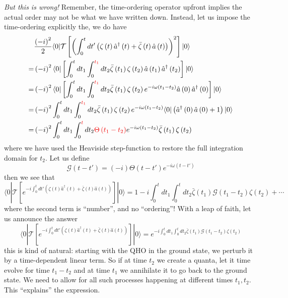 \emph{But this is wrong!} Remember, the time-ordering operator upfront implies the actual order may not be what we have written down. Instead, let us impose the time-ordering explicitly the, we do have
\begin{align*}
    &\frac{\left( -i \right) ^2}{2}\langle 0|\mathcal{T} \left[ \left( \int_0^t{dt'\left( \zeta \left( t \right) \hat{a}^{\dagger}\left( t \right) +\bar{\zeta}\left( t \right) \hat{a}\left( t \right) \right)} \right) ^2 \right] |0\rangle \\
    =&\left( -i \right) ^2\langle 0|\left[ \int_0^t{dt_1\int_0^{{\color[RGB]{240, 0, 0} t_1}}{dt_2\bar{\zeta}\left( t_1 \right) \zeta \left( t_2 \right) \hat{a}\left( t_1 \right) \hat{a}^{\dagger}\left( t_2 \right)}} \right] |0\rangle \\
    =&\left( -i \right) ^2\langle 0|\left[ \int_0^t{dt_1\int_0^{{\color[RGB]{240, 0, 0} t_1}}{dt_2\bar{\zeta}\left( t_1 \right) \zeta \left( t_2 \right) e^{-i\omega \left( t_1-t_2 \right)}}}\hat{a}\left( 0 \right) \hat{a}^{\dagger}\left( 0 \right) \right] |0\rangle \\
    =&\left( -i \right) ^2\int_0^t{dt_1\int_0^{{\color[RGB]{240, 0, 0} t_1}}{dt_2\bar{\zeta}\left( t_1 \right) \zeta \left( t_2 \right) e^{-i\omega \left( t_1-t_2 \right)}}}\langle 0|\left( \hat{a}^{\dagger}\left( 0 \right) \hat{a}\left( 0 \right) +1 \right) |0\rangle \\
    =&\left( -i \right) ^2\int_0^t{dt_1\int_0^{{\color[RGB]{240, 0, 0} t}}{dt_2{\color[RGB]{240, 0, 0} \Theta \left( t_1-t_2 \right) }e^{-i\omega \left( t_1-t_2 \right)}\bar{\zeta}\left( t_1 \right) \zeta \left( t_2 \right)}}
\end{align*}
where we have used the Heaviside step-function to restore the full integration domain for $t_2$. Let us define
\[ \mathscr{G} \left( t-t' \right) =\left( -i \right) \Theta \left( t-t' \right) e^{-i\omega \left( t-t' \right)}\]
then we see that
\[ \langle 0|\mathcal{T} \left[ e^{-i\int_0^t{dt'\left( \zeta \left( t \right) \hat{a}^{\dagger}\left( t \right) +\bar{\zeta}\left( t \right) \hat{a}\left( t \right) \right)}} \right] |0\rangle =1-i\int_0^t{dt_1\int_0^t{dt_2\bar{\zeta}\left( t_1 \right) \mathscr{G} \left( t_1-t_2 \right) \zeta \left( t_2 \right)}}+\cdots \]
where the second term is ``number'', and no ``ordering''! With a leap of faith, let us announce the answer
\[ \langle 0|\mathcal{T} \left[ e^{-i\int_0^t{dt'\left( \zeta \left( t \right) \hat{a}^{\dagger}\left( t \right) +\bar{\zeta}\left( t \right) \hat{a}\left( t \right) \right)}} \right] |0\rangle =e^{-i\int_0^t{dt_1\int_0^t{dt_2\bar{\zeta}\left( t_1 \right) \mathscr{G} \left( t_1-t_2 \right) \zeta \left( t_2 \right)}}}\]
this is kind of natural: starting with the QHO in the ground state, we perturb it by a time-dependent linear term. So if at time $t_2$ we create a quanta, let it time evolve for time $t_1-t_2$ and at time $t_1$ we annihilate it to go back to the ground state. We need to allow for all such processes happening at different times $t_1,t_2$. This ``explains'' the expression.

